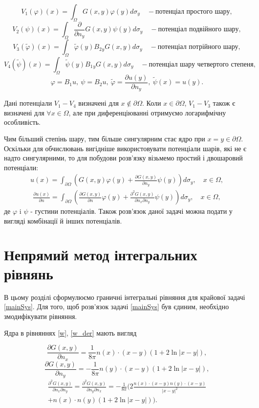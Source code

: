 \documentclass[12pt]{report}
\begin{document}
$$
	V_1(\varphi)(x)=\int_\Omega G(x,y)\varphi(y)d\sigma_y\quad - \textrm{потенціал простого шару},
$$ 
$$
	V_2(\psi)(x)=\int_\Omega\frac{\partial}{\partial n_y}G(x,y)\psi(y) d\sigma_y \quad - \textrm{потенціал подвійного шару},
$$
 $$
 	V_3(\widetilde{\varphi})(x)=\int_\Omega\widetilde{\varphi}(y) B_2{_y}G(x,y)d\sigma_y\quad - \textrm{потенціал потрійного шару},
$$ 
 $$	
 	V_4(\widetilde{\psi})(x)=\int_\Omega\widetilde{\psi}(y)B_1{_y}G(x,y)d\sigma_y\quad - \textrm{потенціал шару четвертого степеня},
$$
 $$
 	\varphi=B_1 u, \ \psi=B_2 u, \ \widetilde{\varphi}=\frac{\partial u(y)}{\partial n_y}, \ \widetilde{\psi}(x)=u(y).
$$ 
 
  Дані потенціали $V_1-V_4$ визначені для $ x\notin \partial\Omega$. Коли $ x\in \partial\Omega$, $V_1-V_3$ також є визначені для $\forall x\in\Omega$, але при диференціюванні отримуємо логарифмічну особливість.
  
 Чим більший степінь шару, тим більше сингулярним стає ядро при $x=y\in\partial\Omega$. Оскільки для обчислювань вигідніше використовувати потенціали шарів, які не є надто сингулярними, то для побудови розв'язку візьмемо простий і двошаровий потенціали:
\begin{gather}
 \label{w}
 	 u(x)=\int_{\partial\Omega}(G(x,y)\varphi(y)+\frac{\partial G(x,y)}{\partial n_y}\psi(y))d\sigma_y, \quad x\in\Omega,
 \end{gather}
  \begin{gather}
 \label{w_der}
	\frac{\partial u(x)}{\partial n}=\int_{\partial\Omega}(\frac{\partial G(x,y)}{\partial n}\varphi(y)+\frac{\partial^2 G(x,y)}{\partial n_x \partial n_y}\psi(y))d\sigma_y, \quad x\in\Omega,
 \end{gather}
 де $\varphi$ i $\psi$ - густини потенціалів. Також розв'язок даної задачі можна подати у вигляді комбінації й інших потенціалів. 
 
 
 
 \section{Непрямий метод інтегральних рівнянь}
 
 В цьому розділі сформулюємо граничні інтегральні рівняння для крайової задачі \eqref{mainSys}. Для того, щоб розв'язок задачі \eqref{mainSys} був єдиним, необхідно змодифікувати рівняння. 
 
 Ядра в рівняннях \eqref{w}, \eqref{w_der} мають вигляд
 
 \begin{equation}
 	\frac{\partial G(x,y)}{\partial n_x}=\frac{1}{8\pi}n(x)\cdot(x-y)(1+2\ln|x-y|),
 \end{equation}
 \begin{equation}
 	\frac{\partial G(x,y)}{\partial n_y}=-\frac{1}{8\pi}n(y)\cdot(x-y)(1+2\ln|x-y|),
 \end{equation}
 \begin{gather}
 	\frac{\partial^2 G(x,y)}{\partial n_x\partial n_y}=\frac{\partial^2 G(x,y)}{\partial n_y\partial n_x}=-\frac{1}{8\pi}\bigg(2\frac{n(x)\cdot(x-y)n(y)\cdot(x-y)}{|x-y|^2} \\
	+n(x)\cdot n(y)(1+2\ln|x-y|)\bigg) \nonumber.
 \end{gather}
 
\end{document}
